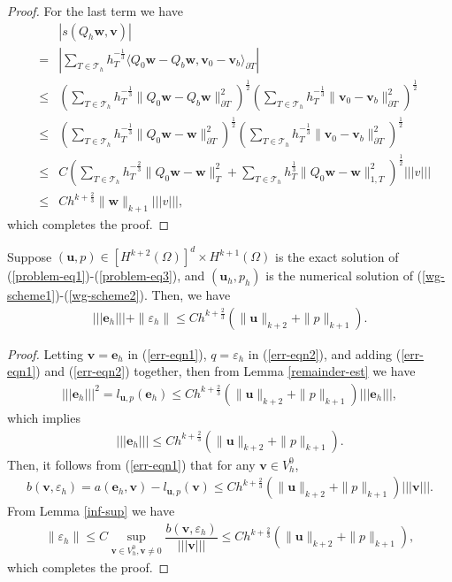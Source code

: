 \documentclass[leqno]{siamltex704}
\numberwithin{equation}{section}
\def\sumT{\sum_{T\in\mathcal{T}_h}}     %
\def\trb{|\!|\!|}
\def\la{\langle}
\def\ra{\rangle_{\partial T}}
\def\e{\varepsilon}
\def\bw{{\mathbf{w}}}
\def\bu{{\mathbf{u}}}
\def\bv{{\mathbf{v}}}
\def\be{{\mathbf{e}}}
\begin{document}
\begin{proof}
  For the last term we have
  \begin{eqnarray*}
    && |s(Q_h\bw,\bv)|
    \\
    &=& \left|\sumT h_T^{-\frac13}\la Q_0\bw-Q_b\bw,\bv_0-\bv_b\ra\right|
    \\
    &\le& \left(\sumT h_T^{-\frac13}\| Q_0\bw-Q_b\bw\|_{\partial T}^2\right)^\frac12
    \left(\sumT h_T^{-\frac13}\|\bv_0-\bv_b\|_{\partial T}^2\right)^\frac12
    \\
    &\le& \left(\sumT h_T^{-\frac13}\| Q_0\bw-\bw\|_{\partial T}^2\right)^\frac12
    \left(\sumT h_T^{-\frac13}\|\bv_0-\bv_b\|_{\partial T}^2\right)^\frac12
    \\
    &\le&  C\left(\sumT h_T^{-\frac23}\| Q_0\bw-\bw\|_{T}^2 + \sumT h_T^{\frac13}\| Q_0\bw-\bw\|_{1,T}^2\right)^\frac12\trb v\trb
    \\
    &\le& Ch^{k+\frac23}\|\bw\|_{k+1}\trb v\trb,
  \end{eqnarray*}
  which completes the proof.
\end{proof}

\begin{theorem}
  Suppose $(\bu,p)\in [H^{k+2}(\Omega)]^d\times H^{k+1}(\Omega)$ is the exact solution of (\ref{problem-eq1})-(\ref{problem-eq3}),
  and $(\bu_h,p_h)$ is the numerical solution of (\ref{wg-scheme1})-(\ref{wg-scheme2}). Then, we have
  \begin{eqnarray*}
    \trb \be_h\trb + \|\e_h\| \le Ch^{k+\frac23}(\|\bu\|_{k+2}+\|p\|_{k+1}).
  \end{eqnarray*}
\end{theorem}
\begin{proof}
  Letting $\bv=\be_h$ in (\ref{err-eqn1}), $q=\e_h$ in (\ref{err-eqn2}), and adding (\ref{err-eqn1}) and (\ref{err-eqn2}) together, 
  then from Lemma \ref{remainder-est} we have
  \begin{eqnarray*}
    \trb\be_h\trb^2 = l_{\bu,p}(\be_h) \le Ch^{k+\frac23}(\|\bu\|_{k+2}+\|p\|_{k+1})\trb\be_h\trb,
  \end{eqnarray*}
  which implies
  \begin{eqnarray*}
    \trb\be_h\trb \le Ch^{k+\frac23}(\|\bu\|_{k+2}+\|p\|_{k+1}).
  \end{eqnarray*}
  Then, it follows from (\ref{err-eqn1}) that for any $\bv\in V_h^0$,
  \begin{eqnarray*}
    b(\bv,\e_h) = a(\be_h,\bv) - l_{\bu,p}(\bv) \le Ch^{k+\frac23}(\|\bu\|_{k+2}+\|p\|_{k+1})\trb\bv\trb.
  \end{eqnarray*}
  From Lemma \ref{inf-sup} we have
  \begin{eqnarray*}
    \|\e_h\| \le C\sup_{\bv\in V_h^0,\bv\ne 0}\dfrac{b(\bv,\e_h)}{\trb\bv\trb}\le Ch^{k+\frac23}(\|\bu\|_{k+2}+\|p\|_{k+1}),
  \end{eqnarray*}
  which completes the proof.
\end{proof}

%
%
\end{document}
